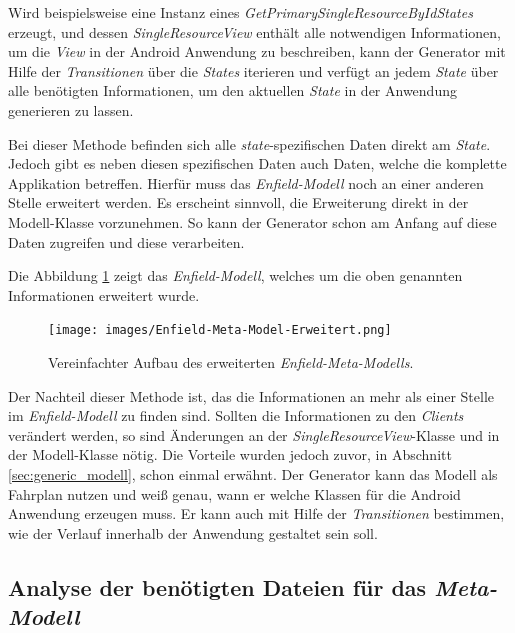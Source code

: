 \newpage

Wird beispielsweise eine Instanz eines \textit{GetPrimarySingleResourceByIdStates} erzeugt, und dessen \textit{SingleResourceView} enthält alle notwendigen Informationen, um die \textit{View} in der Android Anwendung zu beschreiben, kann der Generator mit Hilfe der \textit{Transitionen} über die \textit{States} iterieren und verfügt an jedem \textit{State} über alle benötigten Informationen, um den aktuellen \textit{State} in der Anwendung generieren zu lassen.

Bei dieser Methode befinden sich alle \textit{state}-spezifischen Daten direkt am \textit{State}. Jedoch gibt es neben diesen spezifischen Daten auch Daten, welche die komplette Applikation betreffen. Hierfür muss das \textit{Enfield-Modell} noch an einer anderen Stelle erweitert werden. 
Es erscheint sinnvoll, die Erweiterung direkt in der Modell-Klasse vorzunehmen. So kann der Generator schon am Anfang auf diese Daten zugreifen und diese verarbeiten.

Die Abbildung \ref{fig:enfield-model-extended} zeigt das \textit{Enfield-Modell}, welches um die oben genannten Informationen erweitert wurde.

\begin{figure}[H]
	\begin{center}
		\texttt{[image: images/Enfield-Meta-Model-Erweitert.png]}
		\caption{Vereinfachter Aufbau des erweiterten \textit{Enfield-Meta-Modells}.}
		\label{fig:enfield-model-extended}
	\end{center}
\end{figure}

Der Nachteil dieser Methode ist, das die Informationen an mehr als einer Stelle im \textit{Enfield-Modell} zu finden sind. Sollten die Informationen zu den \textit{Clients} verändert werden, so sind Änderungen an der \textit{SingleResourceView}-Klasse und in der Modell-Klasse nötig. Die Vorteile wurden jedoch zuvor, in Abschnitt \ref{sec:generic_modell}, schon einmal erwähnt. Der Generator kann das Modell als Fahrplan nutzen und weiß genau, wann er welche Klassen für die Android Anwendung erzeugen muss. Er kann auch mit Hilfe der \textit{Transitionen} bestimmen, wie der Verlauf innerhalb der Anwendung gestaltet sein soll.

\subsection{Analyse der benötigten Dateien für das \textit{Meta-Modell}}

